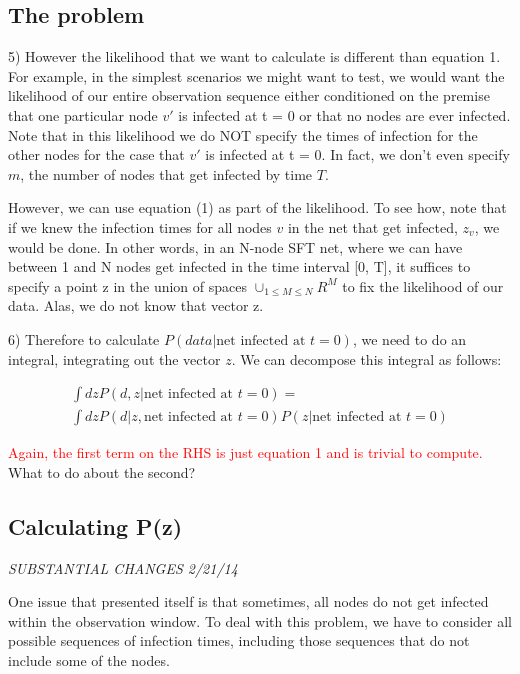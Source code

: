 \documentclass{article}
\begin{document}
\subsection{The problem}
	
        5) However the likelihood that we want to calculate is different than 
        equation 1.  For example, in the simplest scenarios we might want
	to test, we would want the likelihood of our entire observation
	sequence either conditioned on the premise that one particular node
	$v'$ is infected at t = 0 or that no nodes are ever infected. 
        Note that in this likelihood we do NOT 
        specify the times of infection for the other nodes for the case that 
        $v'$ is infected at t = 0. In fact, we don't even specify $m$, the number
        of nodes that get infected by time $T$.


	However, we can use equation (1) as part of the  likelihood. To see how, 
        note that if we knew the infection times for all nodes $v$ in the net 
        that get infected,  $z_{v}$,  we would be done.  In other words, in an 
        N-node SFT net, where we can have between 1 and N nodes get infected in 
        the time interval [0, T], it suffices to specify a point z in the union 
        of spaces $\cup_{1 \le M \le N} R^M$ to fix the likelihood of our data.
        Alas, we do not know that vector z.


	6) Therefore to calculate  $P(data  | \text{net infected at } t = 0)$, 
        we need to do an integral, integrating out the vector $z$. We can 
        decompose this integral as follows:

\begin{align}
\int dz P(d, z | \text{net infected at } t = 0) = \\ \nonumber
\int dz P(d | z, \text{net infected at } t = 0) P(z | \text{net infected at } t=0)
\label{main}
\end{align}

	  \textcolor{red}{Again, the first term on the RHS is just equation 1 and 
          is trivial to compute.} What to do about the second?

\subsection{Calculating P(z)}

\emph{SUBSTANTIAL CHANGES 2/21/14}

    One issue that presented itself is that sometimes, all nodes do not get infected within
    the observation window.  To deal with this problem, we have to consider all possible sequences
    of infection times, including those sequences that do not include some of the nodes.  
\end{document}
